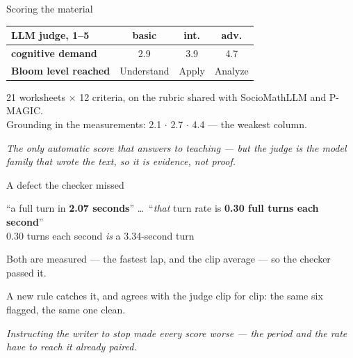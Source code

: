 \documentclass[aspectratio=169,10pt]{beamer}
\newcommand{\takeaway}[1]{\vfill{\footnotesize\itshape\color{cGrey}#1\par}}
\begin{document}
\begin{frame}{Scoring the material}
\vfill
\begin{center}
\small
\renewcommand{\arraystretch}{1.5}
\begin{tabular}{@{}p{4.4cm}ccc@{}}
\toprule
\rowcolor{cPed!12}
\textbf{LLM judge, 1--5} & \textbf{\color{cBasic}basic} & \textbf{\color{cInter}int.}
& \textbf{\color{cAdv}adv.} \\
\midrule
\textbf{cognitive demand} & 2.9 & 3.9 & 4.7 \\
\textbf{Bloom level reached} & Understand & Apply & Analyze \\
\bottomrule
\end{tabular}
\end{center}
\vfill
\begin{center}
{\footnotesize 21 worksheets $\times$ 12 criteria, on the rubric shared with SocioMathLLM and
P-MAGIC.\\ Grounding in the measurements: 2.1 $\cdot$ 2.7 $\cdot$ 4.4 --- the weakest column.}
\end{center}
\vfill
\takeaway{The only automatic score that answers to teaching --- but the judge is the model family
that wrote the text, so it is evidence, not proof.}
\end{frame}

\begin{frame}{A defect the checker missed}
\vfill
\begin{center}
\begin{tcolorbox}[colback=cAccent!6,colframe=cAccent,boxsep=2pt,left=8pt,right=8pt,top=5pt,bottom=5pt,width=0.92\textwidth]
\centering ``a full turn in \textbf{2.07 seconds}'' \dots\ ``\emph{that} turn rate is
\textbf{0.30 full turns each second}''\\[2pt]
{\footnotesize 0.30 turns each second \emph{is} a 3.34-second turn}
\end{tcolorbox}
\end{center}
\vfill
\begin{center}
\small Both are measured --- the fastest lap, and the clip average --- so the checker passed it.
\end{center}
\vfill
\begin{center}
{\footnotesize A new rule catches it, and agrees with the judge clip for clip:
the same six flagged, the same one clean.}
\end{center}
\takeaway{Instructing the writer to stop made every score worse --- the period and the rate have to
reach it already paired.}
\end{frame}
\end{document}
